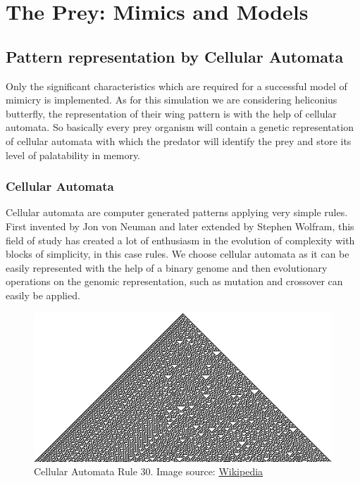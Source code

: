 \section{The Prey: Mimics and Models}

\subsection{Pattern representation by Cellular Automata}
Only the significant characteristics which are required for a successful model of mimicry is implemented. As for this simulation we are considering heliconius butterfly, the representation of their wing pattern is with the help of cellular automata. So basically every prey organism will contain a genetic representation of cellular automata with which the predator will identify the prey and store its level of palatability in memory.

\subsubsection{Cellular Automata}

Cellular automata are computer generated patterns applying very simple rules. First invented by Jon von Neuman and later extended by Stephen Wolfram, this field of study has created a lot of enthusiasm in the evolution of complexity with blocks of simplicity, in this case rules. We choose cellular automata as it can be easily represented with the help of a binary genome and then evolutionary operations on the genomic representation, such as mutation and crossover can easily be applied.

\begin{figure}[H]
	\centering
	\includegraphics[scale=5]{images/CA_rule30s}
	\caption{Cellular Automata Rule 30.
	Image source: \href{http://en.wikipedia.org/wiki/Cellular_automata}{Wikipedia}}
	\label{fig:cellular-automata-rule-30}
\end{figure}


